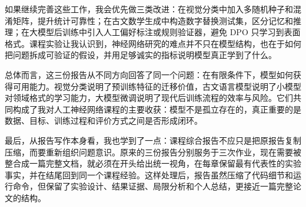 \documentclass[a4paper,11pt,twocolumn]{article}
\begin{document}
如果继续完善这些工作，我会优先做三类改进：在视觉分类中加入多随机种子和混淆矩阵，提升统计可靠性；在古文数学生成中构造数字替换测试集，区分记忆和推理；在大模型后训练中引入人工偏好标注或规则验证器，避免 DPO 只学习到表面格式。课程实验让我认识到，神经网络研究的难点并不只在模型结构，也在于如何把问题拆成可验证的假设，并用足够诚实的指标说明模型真正学到了什么。

总体而言，这三份报告从不同方向回答了同一个问题：在有限条件下，模型如何获得可用能力。视觉分类说明了预训练特征的迁移价值，古文语言模型说明了小模型对领域格式的学习能力，大模型微调说明了现代后训练流程的效率与风险。它们共同构成了我对人工神经网络课程的主要收获：模型不是孤立存在的，真正重要的是数据、目标、训练过程和评价方式之间是否形成闭环。

最后，从报告写作本身看，我也学到了一点：课程综合报告不应只是把原报告复制压缩，而要重新组织问题意识。原来的三份报告分别服务于三次作业，现在需要被整合成一篇完整文档，就必须在开头给出统一视角，在每章保留最有代表性的实验事实，并在结尾回到同一个课程经验。这样处理后，报告虽然压缩了代码细节和运行命令，但保留了实验设计、结果证据、局限分析和个人总结，更接近一篇完整论文的结构。
\end{document}
